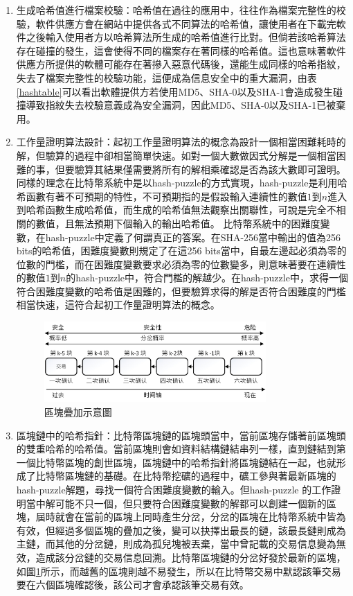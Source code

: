 				\begin{enumerate}
				\item 生成哈希值進行檔案校驗：哈希值在過往的應用中，往往作為檔案完整性的校驗，軟件供應方會在網站中提供各式不同算法的哈希值，讓使⽤者在下載完軟件之後輸⼊使⽤者方以哈希算法所⽣成的哈希值進⾏⽐對。但倘若該哈希算法存在碰撞的發生，這會使得不同的檔案存在著同樣的哈希值。這也意味著軟件供應方所提供的軟體可能存在著摻入惡意代碼後，還能生成同樣的哈希指紋，失去了檔案完整性的校驗功能，這便成為信息安全中的重大漏洞，由表\ref{hashtable}可以看出軟體提供方若使用MD5、SHA-0以及SHA-1會造成發生碰撞導致指紋失去校驗意義成為安全漏洞，因此MD5、SHA-0以及SHA-1已被棄用。

				\item 工作量證明算法設計：起初工作量證明算法的概念為設計一個相當困難耗時的解，但驗算的過程中卻相當簡單快速。如對一個大數做因式分解是一個相當困難的事，但要驗算其結果僅需要將所有的解相乘確認是否為該大數即可證明。同樣的理念在比特幣系統中是以hash-puzzle的方式實現，hash-puzzle是利用哈希函數有著不可預期的特性，不可預期指的是假設輸入連續性的數值$1$到$n$進入到哈希函數生成哈希值，而生成的哈希值無法觀察出關聯性，可說是完全不相關的數值，且無法預期下個輸入的輸出哈希值。
				比特幣系統中的困難度變數，在hash-puzzle中定義了何謂真正的答案。在SHA-256當中輸出的值為256 bits的哈希值，困難度變數則規定了在這256 bits當中，自最左邊起必須為零的位數的門檻，而在困難度變數要求必須為零的位數變多，則意味著要在連續性的數值$1$到$n$的hash-puzzle中，符合門檻的解越少。在hash-puzzle中，求得一個符合困難度變數的哈希值是困難的，但要驗算求得的解是否符合困難度的門檻相當快速，這符合起初工作量證明算法的概念。

				\begin{figure}[!htbp]
					\centering
					\includegraphics[width = 0.8\textwidth]{6confirm.jpg}
					\caption{區塊疊加示意圖}\label{6confirm}
				\end{figure}

				\item 區塊鏈中的哈希指針：比特幣區塊鏈的區塊頭當中，當前區塊存儲著前區塊頭的雙重哈希的哈希值。當前區塊則會如資料結構鏈結串列一樣，直到鏈結到第一個比特幣區塊的創世區塊，區塊鏈中的哈希指針將區塊鏈結在一起，也就形成了比特幣區塊鏈的基礎。在比特幣挖礦的過程中，礦工參與著最新區塊的hash-puzzle解題，尋找一個符合困難度變數的輸入。但hash-puzzle 的工作證明當中解可能不只一個，但只要符合困難度變數的解都可以創建一個新的區塊，屆時就會在當前的區塊上同時產生分岔，分岔的區塊在比特幣系統中皆為有效，但經過多個區塊的疊加之後，變可以抉擇出最長的鏈，該最長鏈則成為主鏈，而其他的分岔鏈，則成為孤兒塊被丟棄，當中曾記載的交易信息變為無效，造成該分岔鏈的交易信息回溯。比特幣區塊鏈的分岔好發於最新的區塊，如圖\ref{6confirm}所示，而越舊的區塊則越不易發生，所以在比特幣交易中默認該筆交易要在六個區塊確認後，該公司才會承認該筆交易有效。

				\end{enumerate}

